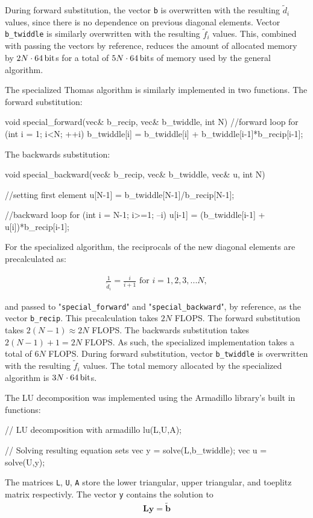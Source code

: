 \documentclass[english,notitlepage,reprint,nofootinbib]{revtex4-1}  %
\begin{document}
During forward substitution, the vector \verb+b+ is overwritten with the resulting \(\tilde{d}_{i}\) values, since there is no dependence on previous diagonal elements. Vector \verb+b_twiddle+ is similarly overwritten with the resulting \(\tilde{f}_{i}\) values. This, combined with passing the vectors by reference, reduces the amount of allocated memory by \(2N\cdot \SI{64}{\bit}\)s for a total of \(5N\cdot \SI{64}{\bit}\)s of memory used by the general algorithm.

The specialized Thomas algorithm is similarly implemented in two functions. The forward substitution:
\begin{cpp}
void special_forward(vec& b_recip, vec& b_twiddle, int N)
{
  //forward loop
  for (int i = 1; i<N; ++i){
    b_twiddle[i] = b_twiddle[i] + b_twiddle[i-1]*b_recip[i-1];
  }
}
\end{cpp}
The backwards substitution:
\begin{cpp}
void special_backward(vec& b_recip, vec& b_twiddle, vec& u, int N)
{
  //setting first element
  u[N-1] = b_twiddle[N-1]/b_recip[N-1];

  //backward loop
  for (int i = N-1; i>=1; --i){
    u[i-1] = (b_twiddle[i-1] + u[i])*b_recip[i-1];
  }
}
\end{cpp}
For the specialized algorithm, the reciprocals of the new diagonal elements are precalculated as:

\begin{align*}
\frac{1}{\tilde{d}_{i}} = \frac{i}{i+1}\text{ for } i=1,2,3,...N,
\end{align*}

and passed to "\verb+special_forward+" and "\verb+special_backward+", by reference, as the vector \verb+b_recip+. This precalculation takes \(2N\) FLOPS. The forward substitution takes \(2(N-1)\approx 2N\) FLOPS. The backwards substitution takes \(2(N-1)+1 = 2N\) FLOPS. As such, the specialized implementation takes a total of \(6N\) FLOPS. During forward substitution, vector \verb+b_twiddle+ is overwritten with the resulting \(\tilde{f}_{i}\) values. The total memory allocated by the specialized algorithm is \(3N\cdot \SI{64}{\bit}\)s.

The LU decomposition was implemented using the Armadillo library's built in functions:
\begin{cpp}
  // LU decomposition with armadillo
  lu(L,U,A);

  // Solving resulting equation sets
  vec y = solve(L,b_twiddle);
  vec u = solve(U,y);
\end{cpp}
The matrices \verb+L+, \verb+U+, \verb+A+ store the lower triangular, upper triangular, and toeplitz matrix respectivly. The vector \verb+y+ contains the solution to
\begin{align*}
\textbf{Ly} = \tilde{\textbf{b}}
\end{align*}
\end{document}
